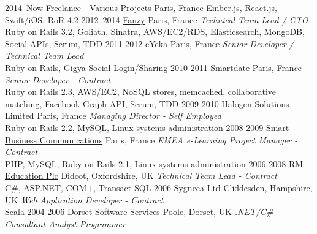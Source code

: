 \documentclass[]{friggeri-cv} %
\begin{document}
\begin{entrylist}
\entry
{2014--Now}
{Freelance - Various Projects}
{Paris, France}
{Ember.js, React.js, Swift/iOS, RoR 4.2}
\entry
{2012--2014}
{\href{https://www.crunchbase.com/organization/fanrank}{Fanzy}}
{Paris, France}
{\emph{Technical Team Lead / CTO} \\
{\color{green}Ruby on Rails 3.2, Goliath, Sinatra, AWS/EC2/RDS, Elasticsearch, MongoDB, Social APIs, Scrum, TDD}}
\entry
{2011-2012}
{\href{https://en.eyeka.com/}{eYeka}}
{Paris, France}
{\emph{Senior Developer / Technical Team Lead} \\
Ruby on Rails, Gigya Social Login/Sharing}
\entry
{2010-2011}
{\href{https://www.crunchbase.com/organization/smartdate}{Smartdate}}
{Paris, France}
{\emph{Senior Developer - Contract} \\
Ruby on Rails 2.3, AWS/EC2, NoSQL stores, memcached, collaborative matching, Facebook Graph API, Scrum, TDD}
\entry
{2009-2010}
{Halogen Solutions Limited}
{Paris, France}
{\emph{Managing Director - Self Employed} \\
Ruby on Rails 2.2, MySQL, Linux systems administration}
\entry
{2008-2009}
{\href{http://www.smartbusinesscom.fr/}{Smart Business Communications}}
{Paris, France}
{\emph{EMEA e-Learning Project Manager - Contract} \\
PHP, MySQL, Ruby on Rails 2.1, Linux systems administration}
\entry
{2006-2008}
{\href{http://www.rm.com/}{RM Education Plc}}
{Didcot, Oxfordshire, UK}
{\emph{Technical Team Lead - Contract} \\
C\#, ASP.NET, COM+, Transact-SQL}
\entry
{2006}
{Sygneca Ltd}
{Cliddesden, Hampshire, UK}
{\emph{Web Application Developer - Contract} \\
Scala}
\entry
{2004-2006}
{\href{http://www.dorsetsoftware.com/}{Dorset Software Services}}
{Poole, Dorset, UK}
{\emph{.NET/C\# Consultant Analyst Programmer}}
\end{entrylist}

\end{document}
